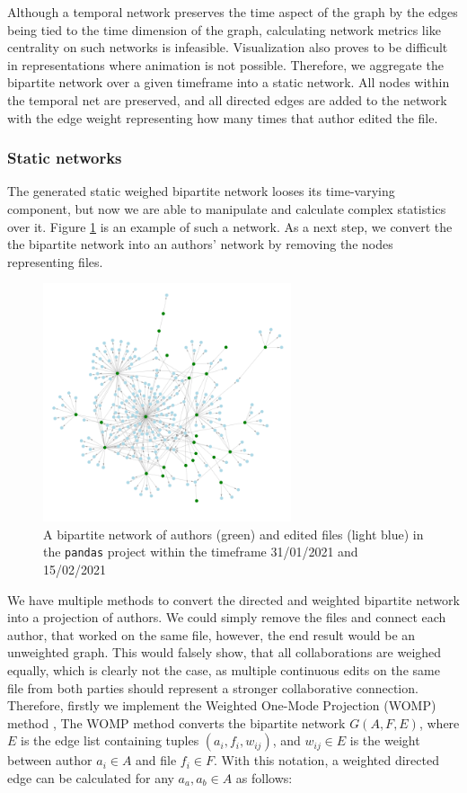 Although a temporal network preserves the time aspect of the graph by the edges being tied to the time dimension of the graph, calculating network metrics like centrality on such networks is infeasible. Visualization also proves to be difficult in representations where animation is not possible. Therefore, we aggregate the bipartite network over a given timeframe into a static network. All nodes within the temporal net are preserved, and all directed edges are added to the network with the edge weight representing how many times that author edited the file.

\subsubsection{Static networks}
The generated static weighed bipartite network looses its time-varying component, but now we are able to manipulate and calculate complex statistics over it. Figure \ref{fig:bipartite} is an example of such a network. As a next step, we convert the the bipartite network into an authors' network by removing the nodes representing files.

\begin{figure}
    \centering
    \includegraphics[width=0.65\textwidth]{figures/bipartite.png}
    \caption{A bipartite network of authors (green) and edited files (light blue) in the \texttt{pandas} project within the timeframe 31/01/2021 and 15/02/2021}
    \label{fig:bipartite}
\end{figure}

We have multiple methods to convert the directed and weighted bipartite network into a projection of authors. We could simply remove the files and connect each author, that worked on the same file, however, the end result would be an unweighted graph. This would falsely show, that all collaborations are weighed equally, which is clearly not the case, as multiple continuous edits on the same file from both parties should represent a stronger collaborative connection. Therefore, firstly we implement the Weighted One-Mode Projection (WOMP) method \cite{stramWeightedOneMode2017}, The WOMP method converts the bipartite network $G(A,F,E)$, where $E$ is the edge list containing tuples $(a_i,f_i,w_{ij})$, and $w_{ij} \in E$ is the weight between author $a_i \in A$ and file $f_i \in F$. With this notation, a weighted directed edge can be calculated for any $a_a, a_b \in A$ as follows:


